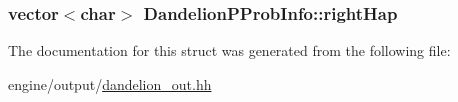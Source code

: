 \label{structDandelionPProbInfo_ac4034ca65eee810a5f0267baa47f1420}
\hypertarget{structDandelionPProbInfo_a015d844a48d0b96a19684df86b0bf959}{
\subsubsection[{rightHap}]{\setlength{\rightskip}{0pt plus 5cm}vector$<$char$>$ {\bf DandelionPProbInfo::rightHap}}}
\label{structDandelionPProbInfo_a015d844a48d0b96a19684df86b0bf959}


The documentation for this struct was generated from the following file:\begin{DoxyCompactItemize}
\item 
engine/output/\hyperlink{dandelion__out_8hh}{dandelion\_\-out.hh}\end{DoxyCompactItemize}
